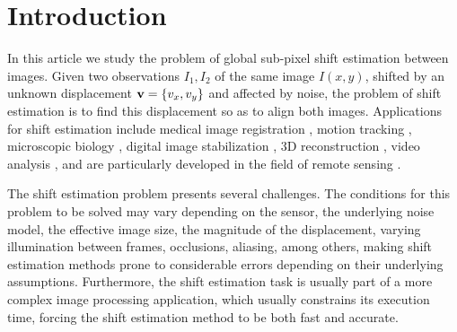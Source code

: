 \section{Introduction}
\label{sec:introShiftEstimation}
In this article we study the problem of global sub-pixel shift estimation between images. Given two observations $I_1, I_2$ of the same image $I(x,y)$, shifted by an unknown displacement $\mathbf{v} = \{v_x, v_y\}$ and affected by noise, the problem of shift estimation is to find this displacement so as to align both images. Applications for shift estimation include medical image registration \cite{letteboer2005brain, hoge2003subspace, maintz1998survey}, motion tracking \cite{ho2008optical}, microscopic biology \cite{KIRKPATRICK_2008}, digital image stabilization \cite{erturk2003digital}, 3D reconstruction \cite{Muquit_2006}, video analysis \cite{Argyriou_2007_Video}, and are particularly developed in the field of remote sensing \cite{Goshtasby_1986, Rais_2014, leprince2007automatic, Sabater_2012}.

The shift estimation problem presents several challenges. The conditions for this problem to be solved may vary depending on the sensor, the underlying noise model, the effective image size, the magnitude of the displacement, varying illumination between frames, occlusions, aliasing, among others, making shift estimation methods prone to considerable errors depending on their underlying assumptions. Furthermore, the shift estimation task is usually part of a more complex image processing application, which usually constrains its execution time, forcing the shift estimation method to be both fast and accurate.

